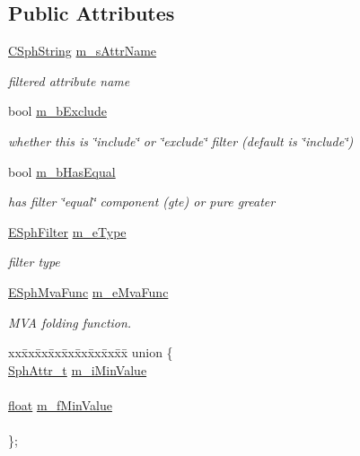 \subsection*{Public Attributes}
\begin{DoxyCompactItemize}
\item 
\hyperlink{structCSphString}{C\-Sph\-String} \hyperlink{classCSphFilterSettings_a44521197066f8647769ba3a0aae69ff0}{m\-\_\-s\-Attr\-Name}
\begin{DoxyCompactList}\small\item\em filtered attribute name \end{DoxyCompactList}\item 
bool \hyperlink{classCSphFilterSettings_aabd848634277dda04df2bfab2d50f551}{m\-\_\-b\-Exclude}
\begin{DoxyCompactList}\small\item\em whether this is \char`\"{}include\char`\"{} or \char`\"{}exclude\char`\"{} filter (default is \char`\"{}include\char`\"{}) \end{DoxyCompactList}\item 
bool \hyperlink{classCSphFilterSettings_ae355b2d7bf90822d0d09b5b68f0439fa}{m\-\_\-b\-Has\-Equal}
\begin{DoxyCompactList}\small\item\em has filter \char`\"{}equal\char`\"{} component (gte) or pure greater \end{DoxyCompactList}\item 
\hyperlink{sphinx_8h_a3b925425803466642d1163991b4d6fbf}{E\-Sph\-Filter} \hyperlink{classCSphFilterSettings_ae212f4330154407a5700c4123aacaebc}{m\-\_\-e\-Type}
\begin{DoxyCompactList}\small\item\em filter type \end{DoxyCompactList}\item 
\hyperlink{sphinx_8h_afb207f61ce068a8cabcadaf049c24029}{E\-Sph\-Mva\-Func} \hyperlink{classCSphFilterSettings_a583ba5fb2b8150d3750027ac3f2b2108}{m\-\_\-e\-Mva\-Func}
\begin{DoxyCompactList}\small\item\em M\-V\-A folding function. \end{DoxyCompactList}\item 
\begin{tabbing}
xx\=xx\=xx\=xx\=xx\=xx\=xx\=xx\=xx\=\kill
union \{\\
\>\hyperlink{sphinx_8h_a7c122d91b0b52a0214ba176636bb1561}{SphAttr\_t} \hyperlink{classCSphFilterSettings_a473a0111b04baca34aecf66dda543457}{m\_iMinValue}\\
\>\\
\>\hyperlink{sphinxexpr_8cpp_a0e0d0739f7035f18f949c2db2c6759ec}{float} \hyperlink{classCSphFilterSettings_a9c0bbe23d0ed8c48e411ddc51038677a}{m\_fMinValue}\\
\>\\
\}; \\


\end{tabbing}
\end{DoxyCompactItemize}
